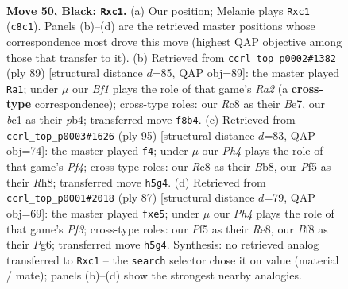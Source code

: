 \documentclass[11pt]{article}
\begin{document}
\clearpage

\begin{figure}[p]\centering
\begin{subfigure}{0.46\textwidth}\centering
\resizebox{\linewidth}{!}{%
\newchessgame
\chessboard[
  setfen={2r2bn1/p5pk/P7/1p3p1p/1P3PPK/1R2P3/6b1/RNB5 b - - 0 50},
  showmover=false,
  pgfstyle=straightmove, color=movearrow, markmove={c8-c1}
]}
\caption{}
\end{subfigure}\hfill
\begin{subfigure}{0.46\textwidth}\centering
\resizebox{\linewidth}{!}{%
\newchessgame
\chessboard[
  setfen={8/r3bk2/4p3/4pp2/1P2P3/1KPR1P1p/1R4rP/3N4 b - - 3 45},
  showmover=false,
  pgfstyle=straightmove, color=movearrow, markmove={a7-a1}
]}
\caption{}
\end{subfigure}
\\[4pt]
\begin{subfigure}{0.46\textwidth}\centering
\resizebox{\linewidth}{!}{%
\newchessgame
\chessboard[
  setfen={1b5r/3b4/p5k1/3P1pp1/p2P2P1/P3NR1P/1P1B4/K7 b - - 1 48},
  showmover=false,
  pgfstyle=straightmove, color=movearrow, markmove={f5-f4}
]}
\caption{}
\end{subfigure}\hfill
\begin{subfigure}{0.46\textwidth}\centering
\resizebox{\linewidth}{!}{%
\newchessgame
\chessboard[
  setfen={4r3/6pk/5pp1/1p1pP2r/3P3n/P2R1P1B/1PR5/6K1 b - - 1 44},
  showmover=false,
  pgfstyle=straightmove, color=movearrow, markmove={f6-e5}
]}
\caption{}
\end{subfigure}
\caption{\textbf{Move 50, Black: \texttt{Rxc1}.} (a) Our position; Melanie plays \texttt{Rxc1} (\texttt{c8c1}). Panels (b)--(d) are the retrieved master positions whose correspondence most drove this move (highest QAP objective among those that transfer to it). (b) Retrieved from \texttt{ccrl\_top\_p0002\#1382} (ply 89) [structural distance $d$=85, QAP obj=89]: the master played \texttt{Ra1}; under $\mu$ our \emph{Bf1} plays the role of that game's \emph{Ra2} (a \textbf{cross-type} correspondence); cross-type roles: our \emph{R}c8 as their \emph{B}e7, our \emph{b}c1 as their \emph{p}b4; transferred move \texttt{f8b4}. (c) Retrieved from \texttt{ccrl\_top\_p0003\#1626} (ply 95) [structural distance $d$=83, QAP obj=74]: the master played \texttt{f4}; under $\mu$ our \emph{Ph4} plays the role of that game's \emph{Pf4}; cross-type roles: our \emph{R}c8 as their \emph{B}b8, our \emph{P}f5 as their \emph{R}h8; transferred move \texttt{h5g4}. (d) Retrieved from \texttt{ccrl\_top\_p0001\#2018} (ply 87) [structural distance $d$=79, QAP obj=69]: the master played \texttt{fxe5}; under $\mu$ our \emph{Ph4} plays the role of that game's \emph{Pf3}; cross-type roles: our \emph{P}f5 as their \emph{R}e8, our \emph{B}f8 as their \emph{P}g6; transferred move \texttt{h5g4}. Synthesis: no retrieved analog transferred to \texttt{Rxc1} -- the \texttt{search} selector chose it on value (material / mate); panels (b)--(d) show the strongest nearby analogies.}
\label{fig:thought-m99}
\end{figure}
\end{document}
